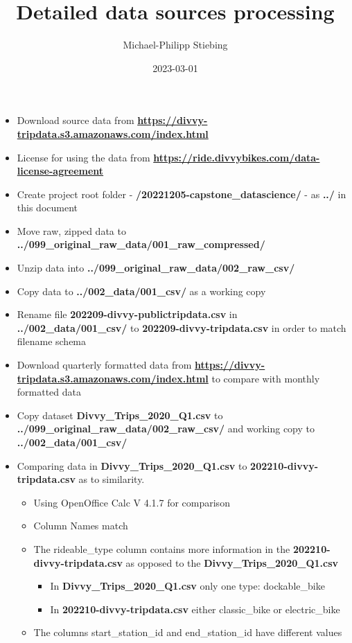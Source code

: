 \documentclass[
]{article}
\title{Detailed data sources processing}
\author{Michael-Philipp Stiebing}
\date{2023-03-01}
\providecommand{\tightlist}{%
  \setlength{\itemsep}{0pt}\setlength{\parskip}{0pt}}
\begin{document}
\maketitle

\begin{itemize}
\item
  Download source data from
  \textbf{\url{https://divvy-tripdata.s3.amazonaws.com/index.html}}
\item
  License for using the data from
  \textbf{\url{https://ride.divvybikes.com/data-license-agreement}}
\item
  Create project root folder - \textbf{/20221205-capstone\_datascience/}
  - as \textbf{../} in this document
\item
  Move raw, zipped data to
  \textbf{../099\_original\_raw\_data/001\_raw\_compressed/}
\item
  Unzip data into \textbf{../099\_original\_raw\_data/002\_raw\_csv/}
\item
  Copy data to \textbf{../002\_data/001\_csv/} as a working copy
\item
  Rename file \textbf{202209-divvy-publictripdata.csv} in
  \textbf{../002\_data/001\_csv/} to \textbf{202209-divvy-tripdata.csv}
  in order to match filename schema
\item
  Download quarterly formatted data from
  \textbf{\url{https://divvy-tripdata.s3.amazonaws.com/index.html}} to
  compare with monthly formatted data
\item
  Copy dataset \textbf{Divvy\_Trips\_2020\_Q1.csv} to
  \textbf{../099\_original\_raw\_data/002\_raw\_csv/} and working copy
  to \textbf{../002\_data/001\_csv/}
\item
  Comparing data in \textbf{Divvy\_Trips\_2020\_Q1.csv} to
  \textbf{202210-divvy-tripdata.csv} as to similarity.

  \begin{itemize}
  \tightlist
  \item
    Using OpenOffice Calc V 4.1.7 for comparison
  \item
    Column Names match
  \item
    The rideable\_type column contains more information in the
    \textbf{202210-divvy-tripdata.csv} as opposed to the
    \textbf{Divvy\_Trips\_2020\_Q1.csv}

    \begin{itemize}
    \tightlist
    \item
      In \textbf{Divvy\_Trips\_2020\_Q1.csv} only one type:
      dockable\_bike
    \item
      In \textbf{202210-divvy-tripdata.csv} either classic\_bike or
      electric\_bike
    \end{itemize}
  \item
    The columns start\_station\_id and end\_station\_id have different
    values


\end{itemize}
\end{itemize}
\end{document}
